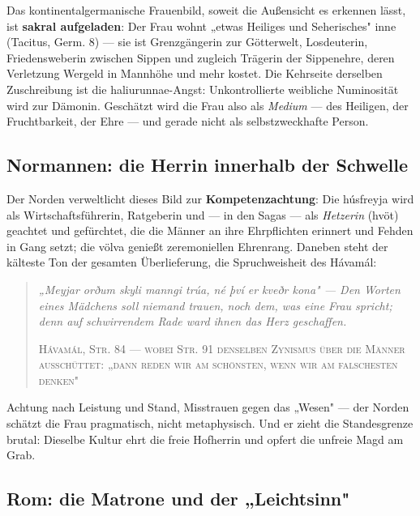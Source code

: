 \documentclass[11pt,a4paper,ngerman]{scrartcl}
\newcommand{\chipbase}[2]{\hspace{0pt}{\footnotesize\textcolor{#1}{[\textsc{#2}]}}}
\newcommand{\chipbelegt}[1]{\chipbase{chipgreen}{#1}}
\newcommand{\chipplausibel}[1]{\chipbase{chipamber}{#1}}
\begin{document}
Das kontinentalgermanische Frauenbild, soweit die Außensicht es erkennen lässt, ist \textbf{sakral aufgeladen}: Der Frau wohnt „etwas Heiliges und Seherisches" inne (Tacitus, Germ. 8) — sie ist Grenzgängerin zur Götterwelt, Losdeuterin, Friedensweberin zwischen Sippen und zugleich Trägerin der Sippenehre, deren Verletzung Wergeld in Mannhöhe und mehr kostet. Die Kehrseite derselben Zuschreibung ist die haliurunnae-Angst: Unkontrollierte weibliche Numinosität wird zur Dämonin. Geschätzt wird die Frau also als \emph{Medium} — des Heiligen, der Fruchtbarkeit, der Ehre — und gerade nicht als selbstzweckhafte Person. \chipplausibel{plausibel}

\subsection*{Normannen: die Herrin innerhalb der Schwelle}

Der Norden verweltlicht dieses Bild zur \textbf{Kompetenzachtung}: Die húsfreyja wird als Wirtschaftsführerin, Ratgeberin und — in den Sagas — als \emph{Hetzerin} (hvöt) geachtet und gefürchtet, die die Männer an ihre Ehrpflichten erinnert und Fehden in Gang setzt; die völva genießt zeremoniellen Ehrenrang. Daneben steht der kälteste Ton der gesamten Überlieferung, die Spruchweisheit des Hávamál:

\begin{quotation}\small\itshape
„Meyjar orðum skyli manngi trúa, né því er kveðr kona" — Den Worten eines Mädchens soll niemand trauen, noch dem, was eine Frau spricht; denn auf schwirrendem Rade ward ihnen das Herz geschaffen.
\par\nopagebreak\smallskip\hfill{\footnotesize\upshape\textsc{Hávamál, Str. 84 — wobei Str. 91 denselben Zynismus über die Männer ausschüttet: „dann reden wir am schönsten, wenn wir am falschesten denken"}}
\end{quotation}

Achtung nach Leistung und Stand, Misstrauen gegen das „Wesen" — der Norden schätzt die Frau pragmatisch, nicht metaphysisch. Und er zieht die Standesgrenze brutal: Dieselbe Kultur ehrt die freie Hofherrin und opfert die unfreie Magd am Grab. \chipbelegt{belegt}

\subsection*{Rom: die Matrone und der „Leichtsinn"}
\end{document}
